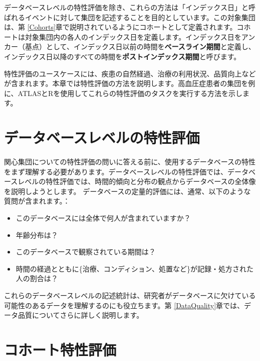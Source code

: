 \documentclass[
  11pt]{book}
\providecommand{\tightlist}{%
  \setlength{\itemsep}{0pt}\setlength{\parskip}{0pt}}
\theoremstyle{definition}
\theoremstyle{definition}
\theoremstyle{definition}
\theoremstyle{definition}
\theoremstyle{remark}
\begin{document}
データベースレベルの特性評価を除き、これらの方法は「インデックス日」と呼ばれるイベントに対して集団を記述することを目的としています。この対象集団は、第 \ref{Cohorts}章で説明されているようにコホートとして定義されます。コホートは対象集団内の各人のインデックス日を定義します。インデックス日をアンカー（基点）として、インデックス日以前の時間を\textbf{ベースライン期間}と定義し、インデックス日以降のすべての時間を\textbf{ポストインデックス期間}と呼びます。

特性評価のユースケースには、疾患の自然経過、治療の利用状況、品質向上などが含まれます。本章では特性評価の方法を説明します。高血圧症患者の集団を例に、ATLASとRを使用してこれらの特性評価のタスクを実行する方法を示します。       

\section{データベースレベルの特性評価}\label{ux30c7ux30fcux30bfux30d9ux30fcux30b9ux30ecux30d9ux30ebux306eux7279ux6027ux8a55ux4fa1}

関心集団についての特性評価の問いに答える前に、使用するデータベースの特性をまず理解する必要があります。データベースレベルの特性評価では、データベースレベルの特性評価では、時間的傾向と分布の観点からデータベースの全体像を説明しようとします。 データベースの定量的評価には、通常、以下のような質問が含まれます。：

\begin{itemize}
\tightlist
\item
  このデータベースには全体で何人が含まれていますか？
\item
  年齢分布は？
\item
  このデータベースで観察されている期間は？
\item
  時間の経過とともに\{治療、コンディション、処置など\}が記録・処方された人の割合は？
\end{itemize}

これらのデータベースレベルの記述統計は、研究者がデータベースに欠けている可能性のあるデータを理解するのにも役立ちます。第 \ref{DataQuality}章では、データ品質についてさらに詳しく説明します。 

\section{コホート特性評価}\label{ux30b3ux30dbux30fcux30c8ux7279ux6027ux8a55ux4fa1}
\end{document}
